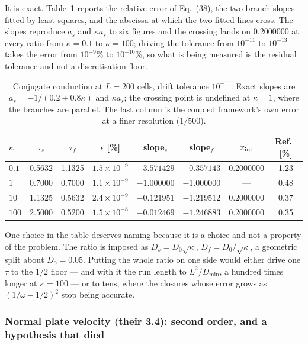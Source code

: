 \documentclass[11pt,a4paper]{article}
\begin{document}
It is exact. Table~\ref{tab:zhoucond} reports the relative error of Eq.~(38),
the two branch slopes fitted by least squares, and the abscissa at which the two
fitted lines cross. The slopes reproduce $a_s$ and $\kappa a_s$ to six figures
and the crossing lands on $0.2000000$ at every ratio from $\kappa=0.1$ to
$\kappa=100$; driving the tolerance from $10^{-11}$ to $10^{-13}$ takes the error
from $10^{-9}\%$ to $10^{-10}\%$, so what is being measured is the residual
tolerance and not a discretisation floor.

\begin{table}[h]
\centering\small
\begin{tabular}{lccccccc}
\toprule
$\kappa$ & $\tau_s$ & $\tau_f$ & $\epsilon$ [\%] & slope$_s$ & slope$_f$ &
$x_{\rm int}$ & Ref.~\cite{zhou2026} [\%] \\
\midrule
$0.1$ & 0.5632 & 1.1325 & $1.5\times10^{-9}$  & $-3.571429$  & $-0.357143$ & 0.2000000 & 1.23 \\
$1$   & 0.7000 & 0.7000 & $1.1\times10^{-9}$  & $-1.000000$  & $-1.000000$ & ---       & 0.48 \\
$10$  & 1.1325 & 0.5632 & $2.4\times10^{-9}$  & $-0.121951$  & $-1.219512$ & 0.2000000 & 0.37 \\
$100$ & 2.5000 & 0.5200 & $1.5\times10^{-8}$  & $-0.012469$  & $-1.246883$ & 0.2000000 & 0.35 \\
\bottomrule
\end{tabular}
\caption{Conjugate conduction at $L=200$ cells, drift tolerance
$10^{-11}$. Exact slopes are $a_s=-1/(0.2+0.8\kappa)$ and $\kappa a_s$; the
crossing point is undefined at $\kappa=1$, where the branches are parallel. The
last column is the coupled framework's own error at a finer resolution
($1/500$).\label{tab:zhoucond}}
\end{table}

\noindent One choice in the table deserves naming because it is a choice and not
a property of the problem. The ratio is imposed as
$D_s = D_0\sqrt\kappa$, $D_f = D_0/\sqrt\kappa$, a geometric split about
$D_0=0.05$. Putting the whole ratio on one side would either drive one $\tau$ to
the $1/2$ floor --- and with it the run length to $L^2/D_{\min}$, a hundred times
longer at $\kappa=100$ --- or to tens, where the closures whose error grows as
$(1/\omega - 1/2)^2$ stop being accurate.

\subsubsection{Normal plate velocity (their 3.4): second order, and a hypothesis that died}
\end{document}
